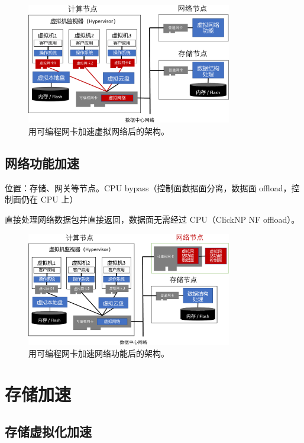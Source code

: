 \begin{figure}[htbp]
	\centering
	\includegraphics[width=0.8\textwidth]{figures/virtual_network.pdf}
	\caption{用可编程网卡加速虚拟网络后的架构。}
	\label{arch:fig:virtual-network}
\end{figure}

\subsection{网络功能加速}


位置：存储、网关等节点。CPU bypass（控制面数据面分离，数据面 offload，控制面仍在 CPU 上）


直接处理网络数据包并直接返回，数据面无需经过 CPU（ClickNP NF offload）。


\begin{figure}[htbp]
	\centering
	\includegraphics[width=0.8\textwidth]{figures/NFV_accel.pdf}
	\caption{用可编程网卡加速网络功能后的架构。}
	\label{arch:fig:network-function}
\end{figure}

\section{存储加速}

\subsection{存储虚拟化加速}


